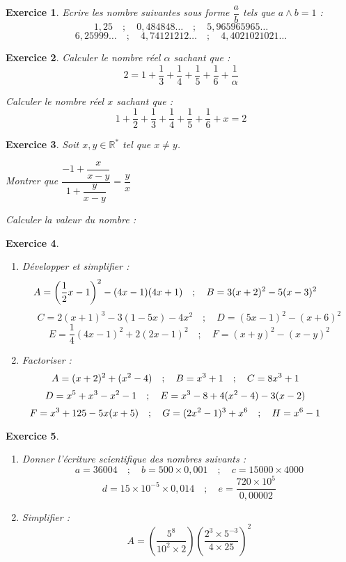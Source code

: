 \documentclass[12pt,a4paper]{article}
\theoremstyle{mystyle}
\newtheorem{exo}{Exercice}
\begin{document}
\begin{multicols*}{2}
\begin{exo}
Ecrire les nombre suivantes sous forme $\dfrac{a}{b}$ tels que $a\wedge b = 1$ :
$$1,25\quad;\quad 0,484848\dots\quad;\quad 5,965965965\dots$$
$$6,25999\dots\quad;\quad4,74121212\dots\quad;\quad4,4021021021\dots$$
\end{exo}

\begin{exo}
Calculer le nombre réel $\alpha$ sachant que : 
$$2 = 1 + \dfrac{1}{3} + \dfrac{1}{4} + \dfrac{1}{5} + \dfrac{1}{6} + \dfrac{1}{\alpha}$$

Calculer le nombre réel $x$ sachant que : 
$$1 + \dfrac{1}{2} + \dfrac{1}{3} + \dfrac{1}{4} + \dfrac{1}{5} + \dfrac{1}{6} + x = 2$$
\end{exo}
	
\begin{exo}
Soit $x,y\in\mathbb{R}^*$ tel que $x\neq y$.
	
	Montrer que $\dfrac{-1 + \dfrac{x}{x - y}}{1 + \dfrac{y}{x - y}} = \dfrac{y}{x}$
	
	Calculer la valeur du nombre : 
\end{exo}


\begin{exo}
\text{ }
	\begin{enumerate}
		\item Développer et simplifier :
		$$\hspace{-10mm}A = \left(\dfrac{1}{2}x - 1\right)^2 - (4x - 1)(4x + 1)  \quad ; \quad B = 3(x+2)^2 - 5(x - 3)^2$$
		$$C = 2(x+1)^3 -3(1-5x) - 4x^2  \quad ; \quad  D = (5x-1)^2 - (x+6)^2$$
		$$E = \dfrac{1}{4}(4x - 1)^2 + 2(2x - 1)^2 \quad;\quad F = (x + y)^2 - (x - y)^2$$
		\item Factoriser :
		\[
\hspace{-10mm} A = (x + 2)^2 + (x^2 - 4) \quad ; \quad B = x^3 + 1\quad;\quad C = 8x^3 + 1 \]
\[
\hspace{-10mm}  D = x^5 + x^3 - x^2 - 1\quad ; \quad E = x^3 - 8 + 4(x^2 - 4) - 3(x - 2)
\]
\[
\hspace{-10mm} F = x^3 + 125 - 5x(x + 5) \quad ; \quad G = (2x^2 - 1)^3 + x^6  \quad ; \quad H = x^6 - 1
\]
	\end{enumerate}
\end{exo}
	
\begin{exo}
	\text{ }
	\begin{enumerate}
		\item Donner l'écriture scientifique des nombres suivants :
		$$a = 36004 \quad;\quad b = 500\times 0,001 \quad;\quad c = 15000 \times 4000$$
		$$d = 15\times 10^{-5}\times 0,014 \quad;\quad e = \dfrac{720\times 10^5}{0,00002}$$
		\item Simplifier :
		$$A = \left(\dfrac{5^8}{10^2\times 2}\right)\left(\dfrac{2^3\times 5^{-3}}{4\times 25}\right)^2 $$
		\end{enumerate}
\end{exo}


\end{multicols*}
\end{document}
